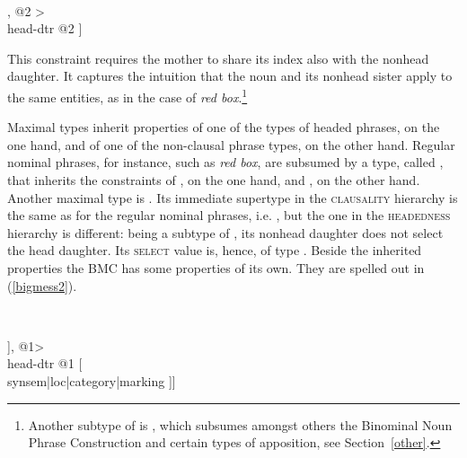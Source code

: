 \documentclass[output=paper
                ,modfonts
                ,nonflat
	        ,collection
	        ,collectionchapter
	        ,collectiontoclongg
 	        ,biblatex
                ,babelshorthands
                ,newtxmath
                ,draftmode
                ,colorlinks, citecolor=brown
]{./langsci/langscibook}
\begin{document}
\begin{exe}
\ex\label{mononom} 
 ~ \impl ~ 
\begin{avm}
[synsem|loc|content|index @1      \\
 dtrs <[synsem|loc|content|index @1 ], @2 > \\
 head-dtr @2  ]
\end{avm}
\end{exe}

\noindent 
This constraint requires the mother to share its index also with the 
nonhead daughter. It captures the intuition that the 
noun and its nonhead sister apply to the same entities, as in 
the case of \emph{red box}.\footnote{Another subtype of  
is , which subsumes amongst others 
the Binominal Noun Phrase Construction and certain types of apposition,
see Section~\ref{other}.}  

Maximal types inherit properties of one of the types of headed phrases,
on the one hand, and of one of the non-clausal phrase types, on the other hand.  
Regular nominal phrases, for instance, such as \emph{red box}, are subsumed 
by a type, called , that inherits the 
constraints of , on the one hand, and 
, on the other hand.  
Another maximal type is . 
Its immediate supertype in the \textsc{clausality} hierarchy is the same 
as for the regular nominal phrases, i.e. , 
but the one in the \textsc{headedness} hierarchy is different: 
being a subtype of , 
its nonhead daughter does not select the head daughter. Its \textsc{select} 
value is, hence, of type . 
Beside the inherited properties the BMC has some properties of its own.   
They are spelled out in (\ref{bigmess2}).

\begin{exe}
\ex\label{bigmess2} 
 ~ \impl ~ 
\begin{avm}
 [ dtrs <[\type{head-functor-phrase}                             \\
          synsem|loc|category [head    & \type{adjective}      \\
                               marking & \type{marked}]], @1>  \\
 head-dtr @1 [                    \\
                synsem|loc|category|marking ]]
\end{avm}
\end{exe}
\end{document}
